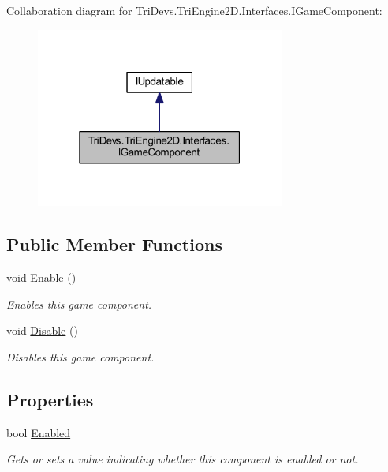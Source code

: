 Collaboration diagram for Tri\-Devs.\-Tri\-Engine2\-D.\-Interfaces.\-I\-Game\-Component\-:
\nopagebreak
\begin{figure}[H]
\begin{center}
\leavevmode
\includegraphics[width=232pt]{interface_tri_devs_1_1_tri_engine2_d_1_1_interfaces_1_1_i_game_component__coll__graph}
\end{center}
\end{figure}
\subsection*{Public Member Functions}
\begin{DoxyCompactItemize}
\item 
void \hyperlink{interface_tri_devs_1_1_tri_engine2_d_1_1_interfaces_1_1_i_game_component_a47b1cb281294d1823fbbb3b5873855d2}{Enable} ()
\begin{DoxyCompactList}\small\item\em Enables this game component. \end{DoxyCompactList}\item 
void \hyperlink{interface_tri_devs_1_1_tri_engine2_d_1_1_interfaces_1_1_i_game_component_aa4824ba36a253c051718b707d022379e}{Disable} ()
\begin{DoxyCompactList}\small\item\em Disables this game component. \end{DoxyCompactList}\end{DoxyCompactItemize}
\subsection*{Properties}
\begin{DoxyCompactItemize}
\item 
bool \hyperlink{interface_tri_devs_1_1_tri_engine2_d_1_1_interfaces_1_1_i_game_component_a39a7ac64358c6ec66237397a1d053365}{Enabled}
\begin{DoxyCompactList}\small\item\em Gets or sets a value indicating whether this component is enabled or not. \end{DoxyCompactList}\end{DoxyCompactItemize}


